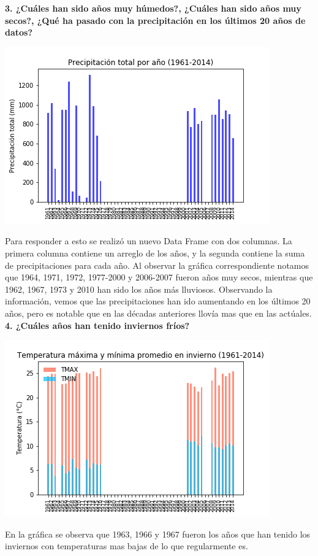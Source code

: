 \documentclass[12pt]{article}
\begin{document}
\noindent\textbf {3. ¿Cuáles han sido años muy húmedos?, ¿Cuáles han sido años muy secos?, ¿Qué ha pasado con la precipitación en los últimos 20 años de datos?} \\
\begin{center}
\includegraphics[scale=0.65]{Precip_anual.png}
\end{center} Para responder a esto se realizó un nuevo Data Frame con dos columnas. La primera columna contiene un arreglo de los años, y la segunda contiene la suma de precipitaciones para cada año. Al observar la gráfica correspondiente notamos que 1964, 1971, 1972, 1977-2000 y 2006-2007 fueron años muy secos, mientras que 1962, 1967, 1973 y 2010 han sido los años más lluviosos. Observando la información, vemos que las precipitaciones han ido aumentando en los últimos 20 años, pero es notable que en las décadas anteriores llovía mas que en las actúales. \\


\noindent\textbf {4. ¿Cuáles años han tenido inviernos fríos?}
\begin{center}
\includegraphics[scale=0.65]{Temperaturasprom_invierno.png}
\end{center} 
En la gráfica se observa que 1963, 1966 y 1967 fueron los años que han tenido los inviernos con temperaturas mas bajas de lo que regularmente es. \\
\end{document}
